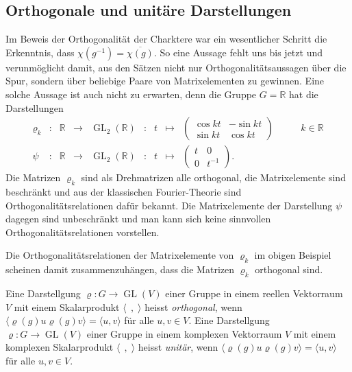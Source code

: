 \subsection{Orthogonale und unitäre Darstellungen}
Im Beweis der Orthogonalität der Charktere war ein wesentlicher
Schritt die Erkenntnis, dass $\chi(g^{-1})=\overline{\chi(g)}$.
So eine Aussage fehlt uns bis jetzt und verunmöglicht damit, aus
den Sätzen
nicht nur Orthogonalitätsaussagen über die Spur, sondern über 
beliebige Paare von Matrixelementen zu gewinnen.
Eine solche Aussage ist auch nicht zu erwarten, denn die Gruppe
$G=\mathbb{R}$ hat die Darstellungen
\begin{equation}
\begin{array}{rclclclcll}
\varrho_k
&\colon&
\mathbb{R} &\to& \operatorname{GL}_2(\mathbb{R})
&:&
t &\mapsto& \begin{pmatrix} \cos kt&-\sin kt\\\sin kt&\cos kt\end{pmatrix}
&\qquad k\in\mathbb{R}
\\
\psi
&\colon&
\mathbb{R} &\to& \operatorname{GL}_2(\mathbb{R})
&:&
t &\mapsto& \begin{pmatrix} t&0\\0&t^{-1}\end{pmatrix}.
&
\end{array}
\end{equation}
Die Matrizen $\varrho_k$ sind als Drehmatrizen alle orthogonal, die
Matrixelemente sind beschränkt und aus der klassischen Fourier-Theorie
sind Orthogonalitätsrelationen dafür bekannt.
Die Matrixelemente der Darstellung $\psi$ dagegen sind unbeschränkt und
man kann sich keine sinnvollen Orthogonalitätsrelationen vorstellen.

Die Orthogonalitätsrelationen der Matrixelemente von $\varrho_k$ 
im obigen Beispiel scheinen damit zusammenzuhängen, dass die Matrizen
$\varrho_k$ orthogonal sind.

\begin{definition}
Eine Darstellgung $\varrho\colon G\to\operatorname{GL}(V)$ einer
Gruppe in einem reellen Vektorraum $V$ mit einem Skalarprodukt
$\langle\;\,,\;\rangle$ heisst {\em orthogonal}, wenn
$\langle\varrho(g)u\varrho(g)v\rangle=\langle u,v\rangle$
für alle $u,v\in V$.
Eine Darstellgung $\varrho\colon G\to\operatorname{GL}(V)$ einer
Gruppe in einem komplexen Vektorraum $V$ mit einem komplexen
Skalarprodukt $\langle\;\,,\;\rangle$ heisst {\em unitär}, wenn
$\langle\varrho(g)u\varrho(g)v\rangle=\langle u,v\rangle$
für alle $u,v\in V$.
\end{definition}


